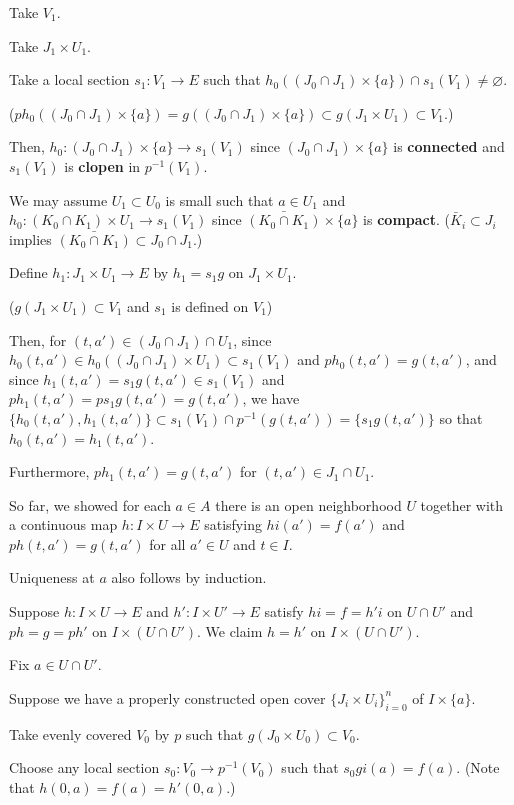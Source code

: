 \documentclass{../../large}
\begin{document}
\begin{pf}
Take $V_1$.

Take $J_1\times U_1$.

Take a local section $s_1:V_1\to E$ such that $h_0((J_0\cap J_1)\times\{a\})\cap s_1(V_1)\ne\varnothing$.

\qquad(\because $ph_0((J_0\cap J_1)\times\{a\})=g((J_0\cap J_1)\times\{a\})\subset g(J_1\times U_1)\subset V_1$.)


Then, $h_0:(J_0\cap J_1)\times\{a\}\to s_1(V_1)$ since $(J_0\cap J_1)\times\{a\}$ is \textbf{connected} and $s_1(V_1)$ is \textbf{clopen} in $p^{-1}(V_1)$.

We may assume $U_1\subset U_0$ is small such that $a\in U_1$ and $h_0:(K_0\cap K_1)\times U_1\to s_1(V_1)$ since $\bar{(K_0\cap K_1)}\times\{a\}$ is \textbf{compact}.
($\bar K_i\subset J_i$ implies $\bar{(K_0\cap K_1)}\subset J_0\cap J_1$.)


Define $h_1:J_1\times U_1\to E$ by $h_1=s_1g$ on $J_1\times U_1$.

\qquad(\because $g(J_1\times U_1)\subset V_1$ and $s_1$ is defined on $V_1$)

Then, for $(t,a')\in(J_0\cap J_1)\cap U_1$, since $h_0(t,a')\in h_0((J_0\cap J_1)\times U_1)\subset s_1(V_1)$ and $ph_0(t,a')=g(t,a')$, and since $h_1(t,a')=s_1g(t,a')\in s_1(V_1)$ and $ph_1(t,a')=ps_1g(t,a')=g(t,a')$, we have $\{h_0(t,a'),h_1(t,a')\}\subset s_1(V_1)\cap p^{-1}(g(t,a'))=\{s_1g(t,a')\}$ so that $h_0(t,a')=h_1(t,a')$.

Furthermore, $ph_1(t,a')=g(t,a')$ for $(t,a')\in J_1\cap U_1$.




\bigskip

So far, we showed for each $a\in A$ there is an open neighborhood $U$ together with a continuous map $h:I\times U\to E$ satisfying $hi(a')=f(a')$ and $ph(t,a')=g(t,a')$ for all $a'\in U$ and $t\in I$.

Uniqueness at $a$ also follows by induction.

Suppose $h:I\times U\to E$ and $h':I\times U'\to E$ satisfy $hi=f=h'i$ on $U\cap U'$ and $ph=g=ph'$ on $I\times(U\cap U')$.
We claim $h=h'$ on $I\times(U\cap U')$.

Fix $a\in U\cap U'$.

Suppose we have a properly constructed open cover $\{J_i\times U_i\}_{i=0}^n$ of $I\times\{a\}$.


\bigskip

Take evenly covered $V_0$ by $p$ such that $g(J_0\times U_0)\subset V_0$.

Choose any local section $s_0:V_0\to p^{-1}(V_0)$ such that $s_0gi(a)=f(a)$. (Note that $h(0,a)=f(a)=h'(0,a)$.)


\end{pf}
\end{document}
